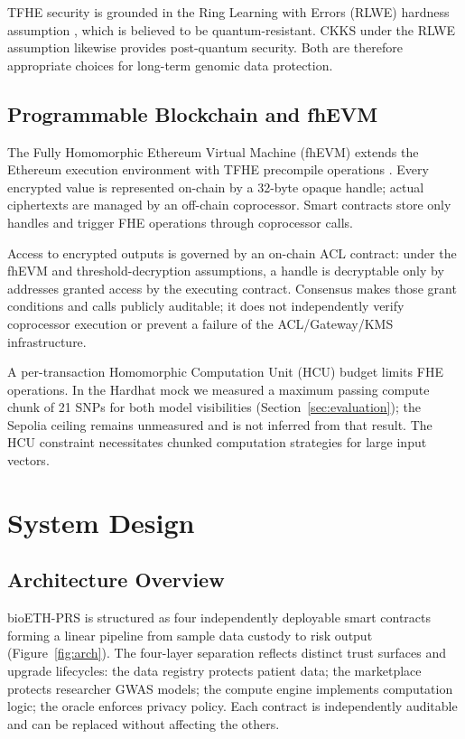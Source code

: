 \documentclass[10pt,twocolumn]{article}
\begin{document}
TFHE security is grounded in the Ring Learning with Errors (RLWE) hardness assumption
\citep{chillotti2020tfhe}, which is believed to be quantum-resistant.  CKKS under the
RLWE assumption likewise provides post-quantum security.  Both are therefore
appropriate choices for long-term genomic data protection.

\subsection{Programmable Blockchain and fhEVM}

The Fully Homomorphic Ethereum Virtual Machine (fhEVM) extends the Ethereum
execution environment with TFHE precompile operations \citep{zamafhevm}.  Every
encrypted value is represented on-chain by a 32-byte opaque handle; actual
ciphertexts are managed by an off-chain coprocessor.  Smart contracts store only
handles and trigger FHE operations through coprocessor calls.

Access to encrypted outputs is governed by an on-chain ACL contract: under the fhEVM
and threshold-decryption assumptions, a handle is decryptable only by addresses granted
access by the executing contract.  Consensus makes those grant conditions and calls
publicly auditable; it does not independently verify coprocessor execution or prevent a
failure of the ACL/Gateway/KMS infrastructure.

A per-transaction Homomorphic Computation Unit (HCU) budget limits FHE operations.
In the Hardhat mock we measured a maximum passing compute chunk of 21 SNPs for both
model visibilities (Section~\ref{sec:evaluation}); the Sepolia ceiling remains
unmeasured and is not inferred from that result.  The HCU constraint necessitates
chunked computation strategies for large input vectors.

\section{System Design}
\label{sec:design}

\subsection{Architecture Overview}

bioETH-PRS is structured as four independently deployable smart contracts forming
a linear pipeline from sample data custody to risk output (Figure~\ref{fig:arch}).
The four-layer separation reflects distinct trust surfaces and upgrade lifecycles:
the data registry protects patient data; the marketplace protects researcher GWAS
models; the compute engine implements computation logic; the oracle enforces privacy
policy.  Each contract is independently auditable and can be replaced without
affecting the others.
\end{document}
